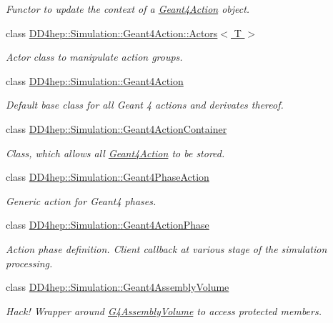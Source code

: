 \begin{DoxyCompactItemize}
\begin{DoxyCompactList}\small\item\em Functor to update the context of a \hyperlink{class_d_d4hep_1_1_simulation_1_1_geant4_action}{Geant4\+Action} object. \end{DoxyCompactList}\item 
class \hyperlink{class_d_d4hep_1_1_simulation_1_1_geant4_action_1_1_actors}{D\+D4hep\+::\+Simulation\+::\+Geant4\+Action\+::\+Actors$<$ T $>$}
\begin{DoxyCompactList}\small\item\em Actor class to manipulate action groups. \end{DoxyCompactList}\item 
class \hyperlink{class_d_d4hep_1_1_simulation_1_1_geant4_action}{D\+D4hep\+::\+Simulation\+::\+Geant4\+Action}
\begin{DoxyCompactList}\small\item\em Default base class for all Geant 4 actions and derivates thereof. \end{DoxyCompactList}\item 
class \hyperlink{class_d_d4hep_1_1_simulation_1_1_geant4_action_container}{D\+D4hep\+::\+Simulation\+::\+Geant4\+Action\+Container}
\begin{DoxyCompactList}\small\item\em Class, which allows all \hyperlink{class_d_d4hep_1_1_simulation_1_1_geant4_action}{Geant4\+Action} to be stored. \end{DoxyCompactList}\item 
class \hyperlink{class_d_d4hep_1_1_simulation_1_1_geant4_phase_action}{D\+D4hep\+::\+Simulation\+::\+Geant4\+Phase\+Action}
\begin{DoxyCompactList}\small\item\em Generic action for Geant4 phases. \end{DoxyCompactList}\item 
class \hyperlink{class_d_d4hep_1_1_simulation_1_1_geant4_action_phase}{D\+D4hep\+::\+Simulation\+::\+Geant4\+Action\+Phase}
\begin{DoxyCompactList}\small\item\em Action phase definition. Client callback at various stage of the simulation processing. \end{DoxyCompactList}\item 
class \hyperlink{class_d_d4hep_1_1_simulation_1_1_geant4_assembly_volume}{D\+D4hep\+::\+Simulation\+::\+Geant4\+Assembly\+Volume}
\begin{DoxyCompactList}\small\item\em Hack! Wrapper around \hyperlink{class_g4_assembly_volume}{G4\+Assembly\+Volume} to access protected members. \end{DoxyCompactList}\item 

\end{DoxyCompactItemize}
